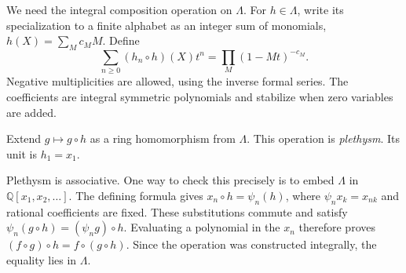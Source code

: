 We need the integral composition operation on $\Lambda$.
For $h\in\Lambda$, write its specialization to a finite alphabet
as an integer sum of monomials, $h(X)=\sum_Mc_MM$.
Define
\[
 \sum_{n\geq0}(h_n\circ h)(X)t^n
 =\prod_M(1-Mt)^{-c_M}.
\]
Negative multiplicities are allowed, using the inverse formal series.
The coefficients are integral symmetric polynomials and stabilize
when zero variables are added.

Extend $g\mapsto g\circ h$ as a ring homomorphism from $\Lambda$.
This operation is \emph{plethysm}.
Its unit is $h_1=x_1$.

Plethysm is associative. One way to check this precisely is to
embed $\Lambda$ in $\mathbb Q[x_1,x_2,\ldots]$.
The defining formula gives $x_n\circ h=\psi_n(h)$,
where $\psi_nx_k=x_{nk}$ and rational coefficients are fixed.
These substitutions commute and satisfy
$\psi_n(g\circ h)=(\psi_ng)\circ h$.
Evaluating a polynomial in the $x_n$ therefore proves
$(f\circ g)\circ h=f\circ(g\circ h)$.
Since the operation was constructed integrally, the equality lies in $\Lambda$.

